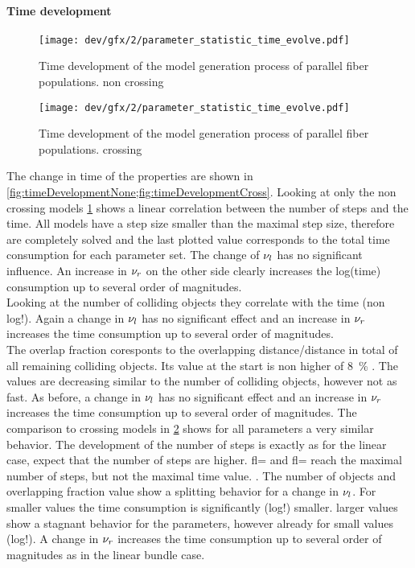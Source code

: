 \paragraph{Time development}
% 
\begin{figure}[p]
\centering
\texttt{[image: dev/gfx/2/parameter\_statistic\_time\_evolve.pdf]}
\caption[Time development parallel]{Time development of the model generation process of parallel fiber populations. non crossing}
\label{fig:timeDevelopmentNone}
\end{figure}
% 
\begin{figure}[p]
\centering
\texttt{[image: dev/gfx/2/parameter\_statistic\_time\_evolve.pdf]}
\caption[Time development parallel]{Time development of the model generation process of parallel fiber populations. crossing }
\label{fig:timeDevelopmentCross}
\end{figure}
% 
The change in time of the properties are shown in \cref{fig:timeDevelopmentNone;fig:timeDevelopmentCross}.
Looking at only the non crossing models \cref{fig:timeDevelopmentNone} shows a linear correlation between the number of steps and the time.
All models have a step size smaller than the maximal step size, therefore are completely solved and the last plotted value corresponds to the total time consumption for each parameter set.
The change of $\textnormal{$\nu_{l}$}$ has no significant influence.
An increase in $\textnormal{$\nu_{r}$}$ on the other side clearly increases the log(time) consumption up to several order of magnitudes.
\\
% 
Looking at the number of colliding objects they correlate with the time (non log!). 
Again a change in $\textnormal{$\nu_{l}$}$ has no significant effect and an increase in $\textnormal{$\nu_{r}$}$ increases the time consumption up to several order of magnitudes.
\\
% 
The overlap fraction coresponts to the overlapping distance/distance in total of all remaining colliding objects.
Its value at the start is non higher of \SI{8}{\percent} \dummy{}.
The values are decreasing similar to the number of colliding objects, however not as fast.
As before, a change in $\textnormal{$\nu_{l}$}$ has no significant effect and an increase in $\textnormal{$\nu_{r}$}$ increases the time consumption up to several order of magnitudes.
% 
The comparison to crossing models in \cref{fig:timeDevelopmentCross} shows for all parameters a very similar behavior.
The development of the number of steps is exactly as for the linear case, expect that the number of steps are higher.
fl=\dummy{} and fl= \dummy{} reach the maximal number of steps, but not the maximal time value.
.
The number of objects and overlapping fraction value show a splitting behavior for a change in $\textnormal{$\nu_{l}$}$.
For smaller values the time consumption is significantly (log!) smaller.
larger values show a stagnant behavior for the parameters, however already for small values (log!).
A change in $\textnormal{$\nu_{r}$}$  increases the time consumption up to several order of magnitudes as in the linear bundle case.
% 
% 
% 
